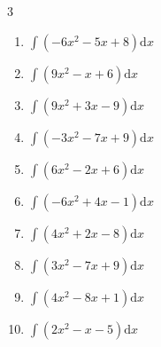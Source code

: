 \begin{multicols}{3}
\begin{enumerate}
\columnbreak %

  \item $\displaystyle \int \left( -6x^{2}-5x+8 \right) \mathrm{d}x$


  \item $\displaystyle \int \left( 9x^{2}-x+6 \right) \mathrm{d}x$


  \item $\displaystyle \int \left( 9x^{2}+3x-9 \right) \mathrm{d}x$


  \item $\displaystyle \int \left( -3x^{2}-7x+9 \right) \mathrm{d}x$


  \item $\displaystyle \int \left( 6x^{2}-2x+6 \right) \mathrm{d}x$


  \item $\displaystyle \int \left( -6x^{2}+4x-1 \right) \mathrm{d}x$


  \item $\displaystyle \int \left( 4x^{2}+2x-8 \right) \mathrm{d}x$


  \item $\displaystyle \int \left( 3x^{2}-7x+9 \right) \mathrm{d}x$


  \item $\displaystyle \int \left( 4x^{2}-8x+1 \right) \mathrm{d}x$


  \item $\displaystyle \int \left( 2x^{2}-x-5 \right) \mathrm{d}x$


\columnbreak %


\end{enumerate}
\end{multicols}
